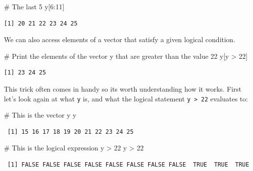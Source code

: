 \documentclass[
  letterpaper,
  DIV=11,
  numbers=noendperiod]{scrreprt}
\newenvironment{Shaded}{\begin{snugshade}}{\end{snugshade}}
\newcommand{\CommentTok}[1]{\textcolor[rgb]{0.37,0.37,0.37}{#1}}
\newcommand{\DecValTok}[1]{\textcolor[rgb]{0.68,0.00,0.00}{#1}}
\newcommand{\NormalTok}[1]{\textcolor[rgb]{0.00,0.23,0.31}{#1}}
\newcommand{\SpecialCharTok}[1]{\textcolor[rgb]{0.37,0.37,0.37}{#1}}
\begin{document}
\begin{Shaded}
\begin{Highlighting}[]
\CommentTok{\# The last 5}
\NormalTok{y[}\DecValTok{6}\SpecialCharTok{:}\DecValTok{11}\NormalTok{]}
\end{Highlighting}
\end{Shaded}

\begin{verbatim}
[1] 20 21 22 23 24 25
\end{verbatim}

We can also access elements of a vector that satisfy a given logical
condition.

\begin{Shaded}
\begin{Highlighting}[]
\CommentTok{\# Print the elements of the vector y that are greater than the value 22}
\NormalTok{y[y }\SpecialCharTok{\textgreater{}} \DecValTok{22}\NormalTok{]}
\end{Highlighting}
\end{Shaded}

\begin{verbatim}
[1] 23 24 25
\end{verbatim}

This trick often comes in handy so its worth understanding how it works.
First let's look again at what \texttt{y} is, and what the logical
statement \texttt{y\ \textgreater{}\ 22} evaluates to:

\begin{Shaded}
\begin{Highlighting}[]
\CommentTok{\# This is the vector y}
\NormalTok{y}
\end{Highlighting}
\end{Shaded}

\begin{verbatim}
 [1] 15 16 17 18 19 20 21 22 23 24 25
\end{verbatim}

\begin{Shaded}
\begin{Highlighting}[]
\CommentTok{\# This is the logical expression y \textgreater{} 22}
\NormalTok{y }\SpecialCharTok{\textgreater{}} \DecValTok{22}
\end{Highlighting}
\end{Shaded}

\begin{verbatim}
 [1] FALSE FALSE FALSE FALSE FALSE FALSE FALSE FALSE  TRUE  TRUE  TRUE
\end{verbatim}
\end{document}
